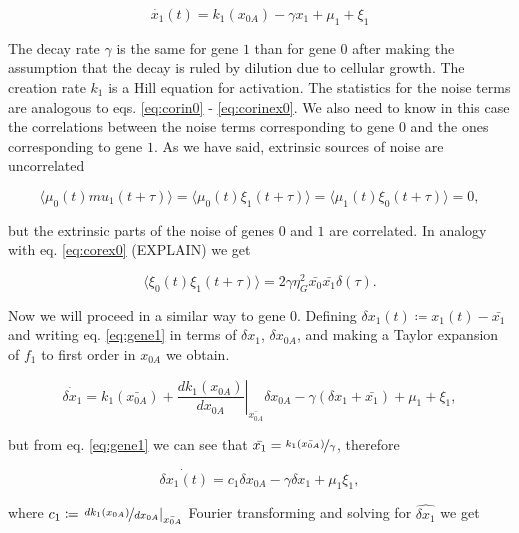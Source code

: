 \begin{equation}
\label{eq:gene1}
\dot{x_1}(t) = k_1(x_{0A})-\gamma x_1+\mu_1+\xi_1
\end{equation}

The decay rate $\gamma$ is the same for gene $1$ than for gene $0$ after making the assumption that the decay is ruled by dilution due to cellular growth. The creation rate $k_1$ is a Hill equation for activation. The statistics for the noise terms are analogous to eqs. \ref{eq:corin0} - \ref{eq:corinex0}. We also need to know in this case the correlations between the noise terms corresponding to gene $0$ and the ones corresponding to gene $1$. As we have said, extrinsic sources of noise are uncorrelated

\begin{equation}
\label{eq:corcross01}
\langle\mu_0(t)mu_1(t+\tau)\rangle = \langle\mu_0(t)\xi_1(t+\tau)\rangle = \langle\mu_1(t)\xi_0(t+\tau)\rangle = 0,
\end{equation}

but the extrinsic parts of the noise of genes $0$ and $1$ are correlated. In analogy with eq. \ref{eq:corex0} (EXPLAIN) we get

\begin{equation}
  \langle\xi_0(t)\xi_1(t+\tau)\rangle = 2\gamma\eta_G^2\bar{x_0}\bar{x_1}\delta(\tau).
\end{equation}

Now we will proceed in a similar way to gene $0$. Defining $\delta x_1(t) \coloneqq x_1(t) - \bar{x_1}$ and writing eq. \ref{eq:gene1} in terms of $\delta x_1$, $\delta x_{0A}$, and making a Taylor expansion of $f_1$ to first order in $x_{0A}$ we obtain.

\begin{equation}
\dot{\delta x_1} = k_1(\bar{x_{0A}}) + \left.\frac{dk_1(x_{0A})}{dx_{0A}}\right|_{\bar{x_{0A}}}\delta x_{0A} - \gamma(\delta x_1 + \bar{x_1}) + \mu_1 + \xi_1,
\end{equation}

but from eq. \ref{eq:gene1} we can see that $\bar{x_1} = \nicefrac{k_1(\bar{x_{0A}})}{\gamma}$, therefore

\begin{equation}
  \label{eq:dgene1}
  \dot{\delta{x_1}(t)}=c_1\delta x_{0A}-\gamma\delta x_1 + \mu_1 \xi_1,
\end{equation}

where $c_1 \coloneqq \left.\nicefrac{dk_1(x_{0A})}{dx_{0A}}\right|_{\bar{x_{0A}}}$ Fourier transforming and solving for $\hat{\delta x_1}$ we get

